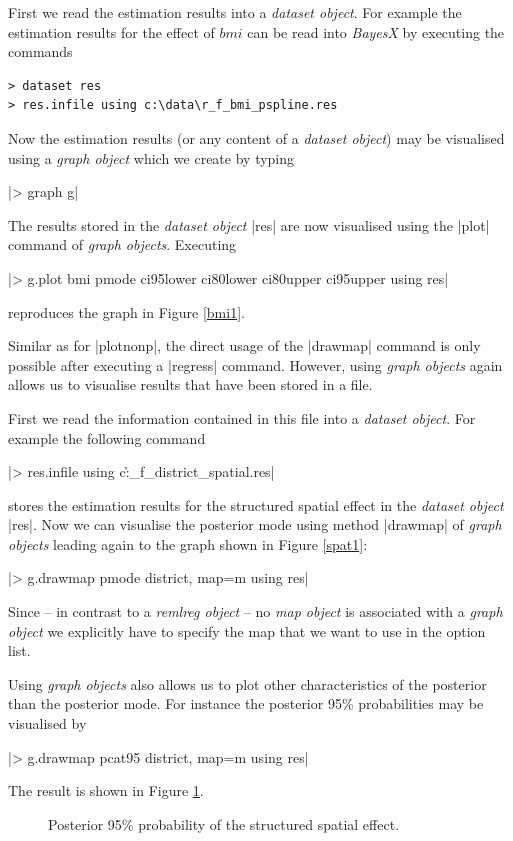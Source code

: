\documentclass[a4paper]{article}
\begin{document}
First we read the estimation results into a {\it dataset object}.
For example the estimation results for the effect of $bmi$ can be
read into {\it BayesX} by executing the commands

\begin{verbatim}
> dataset res
> res.infile using c:\data\r_f_bmi_pspline.res
\end{verbatim}

Now the estimation results (or any content of a {\it dataset
object}) may be visualised using a {\it graph object} which we
create by typing

|> graph g|

The results stored in the {\em dataset object} |res| are now
visualised using the |plot| command of {\it graph objects}.
Executing

 |> g.plot bmi pmode ci95lower ci80lower ci80upper ci95upper using res|

reproduces the graph in Figure \ref{bmi1}.

Similar as for |plotnonp|, the direct usage of the |drawmap|
command is only possible after executing a |regress| command.
However, using {\it graph objects} again allows us to visualise
results that have been stored in a file.

First we read the information contained in this file into a {\it
dataset object}. For example the following command

|> res.infile using c:\data\r_f_district_spatial.res|

stores the estimation results for the structured spatial effect in
the {\em dataset object} |res|. Now we can visualise the posterior
mode using method |drawmap| of {\it graph objects} leading again
to the graph shown in Figure \ref{spat1}:

|> g.drawmap pmode district, map=m using res|

Since -- in contrast to a {\it remlreg object} -- no {\it map
object} is associated with a {\it graph object} we explicitly have
to specify the map that we want to use in the option list.

Using {\it graph objects} also allows us to plot other
characteristics of the posterior than the posterior mode. For
instance the posterior 95\% probabilities may be visualised by

|> g.drawmap pcat95 district, map=m using res|

The result is shown in Figure \ref{spat2}.

\begin{figure}[ht]
\begin{center}
{\it\caption{Posterior 95\% probability of the structured spatial
effect.\label{spat2}}}
\end{center}
\end{figure}
\end{document}
